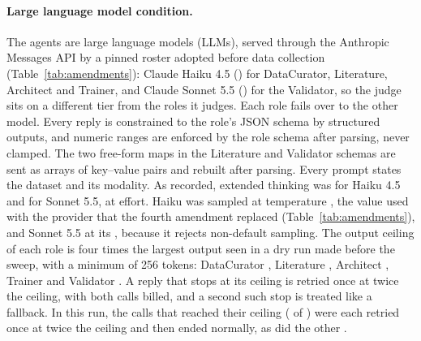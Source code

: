 \paragraph{Large language model condition.} The agents are large language models (LLMs),
served through the Anthropic Messages API by a pinned roster adopted before data collection
(Table~\ref{tab:amendments}): Claude Haiku 4.5 (\resRosterHaiku) for DataCurator, Literature,
Architect and Trainer, and Claude Sonnet 5.5 (\resRosterSonnet) for the Validator,
so the judge sits on a different tier from the roles it judges. Each role fails over to the
other model. Every reply is constrained to the role's JSON schema by structured outputs, and
numeric ranges are enforced by the role schema after parsing, never clamped. The two free-form
maps in the Literature and Validator schemas are sent as arrays of key--value pairs and rebuilt after
parsing. Every prompt states the dataset and its modality. As recorded, extended thinking was \resThinkingHaiku{} for Haiku 4.5 and
\resThinkingSonnet{} for Sonnet 5.5, at \resEffortSonnet{} effort. Haiku was sampled at temperature \resTemperatureHaiku{}, the value
used with the provider that the fourth amendment replaced (Table~\ref{tab:amendments}), and Sonnet 5.5 at its \resSamplingSonnet, because it rejects
non-default sampling. The output ceiling of each role is four times the largest output seen in
a dry run made before the sweep, with a minimum of 256 tokens: DataCurator \resCeilingCurator, Literature
\resCeilingLiterature, Architect \resCeilingArchitect, Trainer \resCeilingTrainer{} and
Validator \resCeilingValidator. A reply that stops at its ceiling is retried once at twice the
ceiling, with both calls billed, and a second such stop is treated like a fallback. In this
run, the calls that reached their ceiling (\resStopMaxTokens{} of \resNCalls) were each retried
once at twice the ceiling and then ended normally, as did the other \resStopEndTurn.

